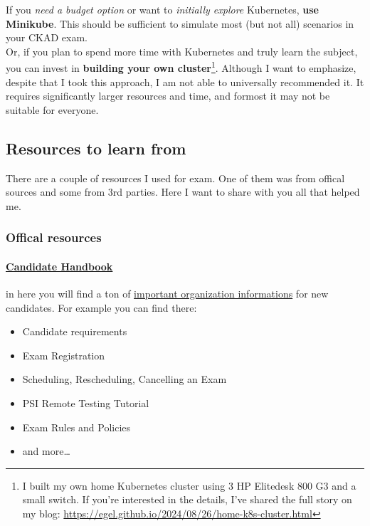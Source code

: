 If you \textit{need a budget option} or want to \textit{initially explore} Kubernetes, \textbf{use Minikube}\cite{minikube-docs}. This should be sufficient to simulate most (but not all) scenarios in your CKAD exam.\\

Or, if you plan to spend more time with Kubernetes and truly learn the subject, you can invest in \textbf{building your own cluster}\footnote{I built my own home Kubernetes cluster using 3 HP Elitedesk 800 G3 and a small switch. If you're interested in the details, I've shared the full story on my blog: \url{https://egel.github.io/2024/08/26/home-k8s-cluster.html}}. Although I want to emphasize, despite that I took this approach, I am not able to universally recommended it. It requires significantly larger resources and time, and formost it may not be suitable for everyone.


\subsection{Resources to learn from}

There are a couple of resources I used for exam. One of them was from offical sources and some from 3rd parties. Here I want to share with you all that helped me.

\subsubsection*{Offical resources}

\paragraph{\href{https://docs.linuxfoundation.org/tc-docs/certification/lf-handbook2}{Candidate Handbook}} in here you will find a ton of \underline{important organization informations} for new candidates. For example you can find there: 

\begin{itemize}
	\item Candidate requirements
	\item Exam Registration
	\item Scheduling, Rescheduling, Cancelling an Exam
	\item PSI Remote Testing Tutorial
	\item Exam Rules and Policies
	\item and more\ldots
\end{itemize}

